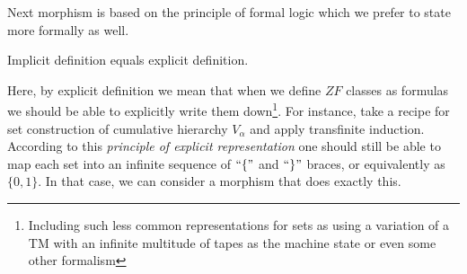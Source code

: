 Next morphism is based on the principle of formal logic which we prefer to state more formally as well. 
\begin{principle}\label{principle_explicit_rep}
  Implicit definition equals explicit definition.
\end{principle}
Here, by explicit definition we mean that when we define $ZF$ classes as formulas we should be able to explicitly write them down\footnote{Including such less common representations for sets as using a variation of a TM with an infinite multitude of tapes as the machine state or even some other formalism}. For instance, take a recipe for set construction of cumulative hierarchy $V_\alpha$ and apply transfinite induction. According to this \textit{principle of explicit representation} one should still be able to map each set into an infinite sequence of $\text{``}\{\text{''}$ and $\text{``}\}\text{''}$ braces, or equivalently as $\{0,1\}$. In that case, we can consider a morphism that does exactly this.

